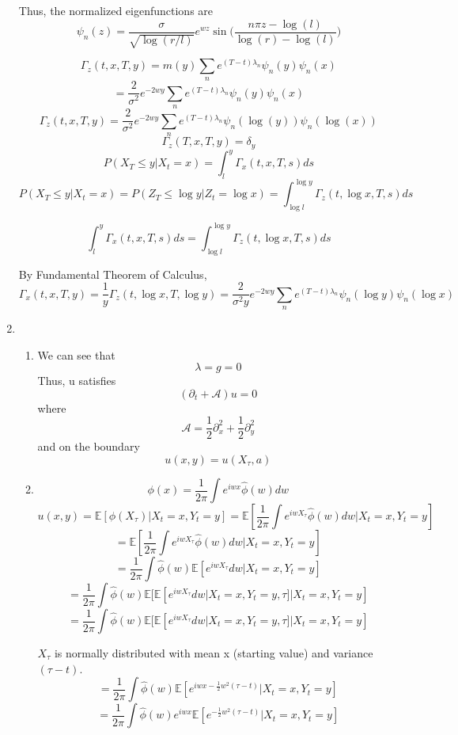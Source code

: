 \documentclass[a4paper,11pt]{article}
\begin{document}
\begin{enumerate}
Thus, the normalized eigenfunctions are
\[\psi_n(z)=\frac{\sigma}{\sqrt{\log(r/l)}} e^{wz} \sin\bigg(\frac{n\pi z - \log(l)}{\log(r)-\log(l)}\bigg)\]


\[\Gamma_z(t,x,T,y)=m(y) \sum_n e^{(T-t) \lambda_n}\psi_n(y)\psi_n(x)\]
\[=\frac{2}{\sigma^2}e^{-2wy} \sum_n e^{(T-t) \lambda_n}\psi_n(y)\psi_n(x)\]
\[\Gamma_z(t,x,T,y)=\frac{2}{\sigma^2}e^{-2wy} \sum_n e^{(T-t) \lambda_n}\psi_n(\log(y))\psi_n(\log(x))\]
\[\Gamma_z(T,x,T,y)=\delta_y\]
\[P(X_T \leq y| X_t=x) = \int_l^y \Gamma_x(t,x,T,s)ds\]
\[P(X_T \leq y| X_t=x) =P(Z_T \leq \log y| Z_t=\log x) = \int_{\log l}^{\log y} \Gamma_z(t,\log x,T,s)ds\]

\[\int_l^y \Gamma_x(t,x,T,s)ds =\int_{\log l}^{\log y} \Gamma_z(t,\log x,T,s)ds\]

By Fundamental Theorem of Calculus,
\[\Gamma_x(t,x,T,y) =\frac{1}{y} \Gamma_z(t,\log x,T,\log y)=\frac{2}{\sigma^2y}e^{-2wy} \sum_n e^{(T-t) \lambda_n}\psi_n(\log y)\psi_n(\log x)\]


\item 
\begin{enumerate}
\item 
We can see that 
\[\lambda = g = 0\]
Thus, u satisfies
\[(\partial_t + \mathcal{A})u =0 \]
where
\[\mathcal{A} = \frac{1}{2}\partial_x^2+ \frac{1}{2}\partial_y^2\]
and on the boundary
\[u(x,y)= u(X_\tau,a)\]

\item
\[\phi(x) = \frac{1}{2\pi}\int e^{iwx}\hat{\phi}(w)dw\]
\[u(x,y) =\mathbb{E}[\phi(X_\tau)|X_t=x, Y_t=y ]= \mathbb{E}[\frac{1}{2\pi}\int e^{iwX_\tau}\hat{\phi}(w)dw|X_t=x, Y_t=y ] \]
\[= \mathbb{E}[\frac{1}{2\pi}\int e^{iwX_\tau}\hat{\phi}(w)dw|X_t=x, Y_t=y ] \]
\[= \frac{1}{2\pi} \int \hat{\phi}(w)  \mathbb{E}[ e^{iwX_\tau}dw|X_t=x, Y_t=y ] \]
\[= \frac{1}{2\pi}\int \hat{\phi}(w) \mathbb{E}[\mathbb{E}[ e^{iwX_\tau}dw|X_t=x, Y_t=y, \tau ]|X_t=x, Y_t=y ] \]
\[= \frac{1}{2\pi}\int \hat{\phi}(w) \mathbb{E}[\mathbb{E}[ e^{iwX_\tau}dw|X_t=x, Y_t=y, \tau ]|X_t=x, Y_t=y ] \]

$X_\tau$  is normally distributed with mean x (starting value) and variance $(\tau-t)$.
\[= \frac{1}{2\pi}\int \hat{\phi}(w)  \mathbb{E}[e^{iwx -\frac{1}{2}w^2(\tau-t)}|X_t=x, Y_t=y ] \]
\[= \frac{1}{2\pi}\int \hat{\phi}(w)  e^{iwx }\mathbb{E}[e^{-\frac{1}{2}w^2(\tau-t)}|X_t=x, Y_t=y ] \]


\end{enumerate}
\end{enumerate}
\end{document}
